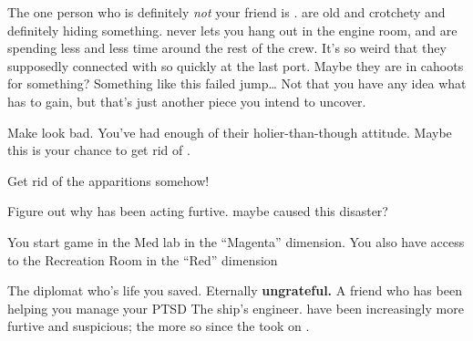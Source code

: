 \documentclass[char]{TMFHope}
\begin{document}
The one person who is definitely \emph{not} your friend is \cEng{}. \cEng{\They} are old and crotchety and definitely hiding something. \cEng{} never lets you hang out in the engine room, and \cEng{\they} are spending less and less time around the rest of the crew. It's so weird that they supposedly connected with \cBoy{} so quickly at the last port. Maybe they are in cahoots for something? Something like this failed jump\ldots{} Not that you have any idea what \cEng{} has to gain, but that's just another piece you intend to uncover.



\begin{itemz}[Goals]
	\item Make \cDip{} look bad. You've had enough of their holier-than-though attitude. Maybe this is your chance to get rid of \cDip{\them}.
	\item Get rid of the apparitions somehow!
	\item Figure out why \cEng{} has been acting furtive. maybe \cEng{\they} caused this disaster?
\end{itemz}

\begin{itemz}[Notes]
	\item You start game in the Med lab in the ``Magenta'' dimension. You also have access to the Recreation Room in the ``Red'' dimension
\end{itemz}

\begin{contacts}
	\contact{\cDip{}} The diplomat who's life you saved. Eternally {\bf ungrateful.}
	\contact{\cNav{}} A friend who has been helping you manage your PTSD
	\contact{\cEng{}} The ship's engineer. \cEng{\They} have been increasingly more furtive and suspicious; the more so since the \pNew{} took on \cBoy{}.
\end{contacts}
\end{document}
